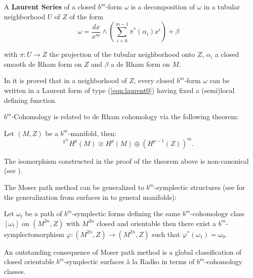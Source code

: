 A {\bf Laurent Series} of a closed $b^m$-form $\omega$ is a decomposition of $\omega$ in a tubular neighborhood $U$ of $Z$
of the form
\begin{equation}\label{eqn:laurent0}
\omega = \frac{dx}{x^m} \wedge (\sum_{i = 0}^{m-1}\pi^*(\alpha_{i})x^i) + \beta
\end{equation}

\noindent with $\pi: U \to Z$ the projection of the tubular neighborhood onto $Z$, $\alpha_{i}$ a closed smooth {de} Rham form on $Z$ and $\beta$  a {de} Rham form on $M$.

In \cite{Scott16} it is proved that in  a  neighborhood of $Z$, every   closed $b^m$-form  $\omega$ can be written in a  Laurent form of type (\ref{eqn:laurent0}) having fixed a (semi)local defining function.

 $b^m$-Cohomology is related to de Rham cohomology via the following theorem:
\begin{theorem}\label{thm:Mazzeo-Melrose}
{Let $(M,Z)$ be a $b^m$-manifold, then:}
\begin{equation}\label{eqn:Mazzeo-Melrose}
 ^{b^m}H^p(M) \cong H^p(M)\oplus(H^{p-1}(Z))^m.
\end{equation}
\end{theorem}

{The isomorphism constructed in the proof of the theorem above is non-canonical (see \cite{Scott16}).}

The Moser path method can be generalized to $b^m$-symplectic structures (see \cite{evageoff} for the generalization from surfaces in \cite{Scott16} to general manifolds):

{\begin{theorem}\label{mpm} Let $\omega_t$ be a path of $b^m$-symplectic forms defining the same $b^m$-cohomology class  $[\omega_t]$ on $(M^{2n}, Z)$ with $M^{2n}$ closed and orientable  then there exist  a $b^m$-symplectomorphism $\varphi: (M^{2n}, Z)\longrightarrow (M^{2n}, Z)$ such that $\varphi^*(\omega_1) = \omega_0$. \end{theorem}}



An outstanding consequence of Moser path method is a global classification of {closed} orientable $b^m$-symplectic surfaces \`{a} la Radko in terms of $b^m$-cohomology classes.


